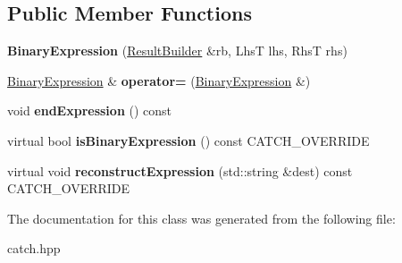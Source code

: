\subsection*{Public Member Functions}
\begin{DoxyCompactItemize}
\item 
\mbox{\label{classCatch_1_1BinaryExpression_a0d81384761aba5f7a6d5f4fc7e7944f3}} 
{\bfseries Binary\+Expression} (\hyperlink{classCatch_1_1ResultBuilder}{Result\+Builder} \&rb, LhsT lhs, RhsT rhs)
\item 
\mbox{\label{classCatch_1_1BinaryExpression_a2147a858eb5866e5643d0ef321064aa1}} 
\hyperlink{classCatch_1_1BinaryExpression}{Binary\+Expression} \& {\bfseries operator=} (\hyperlink{classCatch_1_1BinaryExpression}{Binary\+Expression} \&)
\item 
\mbox{\label{classCatch_1_1BinaryExpression_aa1dba7f316f70902859b8eab27692dfb}} 
void {\bfseries end\+Expression} () const
\item 
\mbox{\label{classCatch_1_1BinaryExpression_a4c617c0b6a73a9cafbbf900909c7c258}} 
virtual bool {\bfseries is\+Binary\+Expression} () const C\+A\+T\+C\+H\+\_\+\+O\+V\+E\+R\+R\+I\+DE
\item 
\mbox{\label{classCatch_1_1BinaryExpression_a6ed73ff9af9c229f9fa3d35d019f9e37}} 
virtual void {\bfseries reconstruct\+Expression} (std\+::string \&dest) const C\+A\+T\+C\+H\+\_\+\+O\+V\+E\+R\+R\+I\+DE
\end{DoxyCompactItemize}


The documentation for this class was generated from the following file\+:\begin{DoxyCompactItemize}
\item 
catch.\+hpp\end{DoxyCompactItemize}
